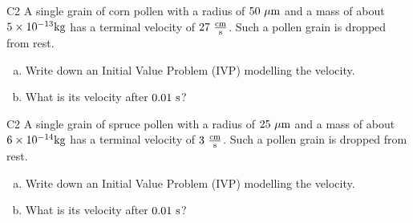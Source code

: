 \begin{problem}{C2}
A single grain of corn pollen with a radius of \(50\ {\rm \mu m}\) and a mass of about \(5 \times 10^{-13} {\rm kg}\) has a terminal velocity of \(27\ {\rm \frac{cm}{s}}\).  Such a pollen grain is dropped from rest.  
\begin{enumerate}[(a)]
\item Write down an Initial Value Problem (IVP) modelling the velocity.
\item What is its velocity after \(0.01\ {\rm s}\)?
\end{enumerate}
\end{problem}

\begin{problem}{C2}
A single grain of spruce pollen with a radius of \(25\ {\rm \mu m}\) and a mass of about \(6 \times 10^{-14} {\rm kg}\) has a terminal velocity of \(3\ {\rm \frac{cm}{s}}\).  Such a pollen grain is dropped from rest.  
\begin{enumerate}[(a)]
\item Write down an Initial Value Problem (IVP) modelling the velocity.
\item What is its velocity after \(0.01\ {\rm s}\)?
\end{enumerate}
\end{problem}



